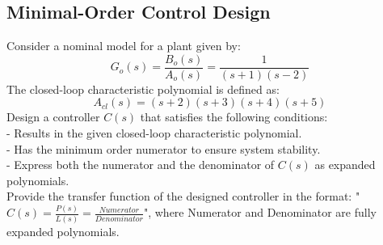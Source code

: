 \documentclass[12pt]{article}
\begin{document}
\subsection{Minimal-Order Control Design}

Consider a nominal model for a plant given by:
\begin{equation}
G_o(s) = \frac{B_o(s)}{A_o(s)}=\frac{1}{(s + 1)(s - 2)}
\end{equation}
The closed-loop characteristic polynomial is defined as:
\begin{equation}
A_{cl}(s) = (s + 2)(s + 3)(s + 4)(s + 5)
\end{equation}
Design a controller \(C(s)\) that satisfies the following conditions:\\
- Results in the given closed-loop characteristic polynomial.\\
- Has the minimum order numerator to ensure system stability.\\
- Express both the numerator and the denominator of \(C(s)\) as expanded polynomials.\\

Provide the transfer function of the designed controller in the format: " \(C(s) = \frac{P(s)}{L(s)}=\frac{Numerator}{Denominator}\)", where Numerator and Denominator are fully expanded polynomials.
\end{document}
